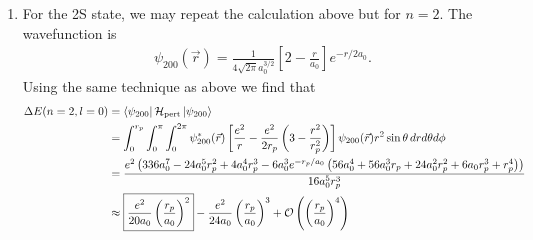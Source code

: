 \documentclass{article}
\theoremstyle{definition}
\newcommand{\ham}{\mathcal{H}}
\newcommand{\f}[2]{\frac{#1}{#2}}
\newcommand{\lp}{\left(}
\newcommand{\rp}{\right)}
\newcommand{\lb}{\left[}
\newcommand{\rb}{\right]}
\begin{document}
\begin{enumerate}[label=(\alph*)]
	
	Mathematica code:
	\begin{lstlisting}
	(*define psi_100*)
	In[4]:= psi100 = (1/Sqrt[Pi])*(1/a0)^(3/2)*Exp[-r/a0];
	
	(*Evaluate integral*)
	In[5]:= Integrate[
	psi100*psi100*(e^2/r - (e^2/(2*rp))*(3 - r^2/rp^2))*r^2*Sin[t], {r, 
	0, rp}, {t, 0, Pi}, {p, 0, 2 Pi}] // FullSimplify
	
	Out[5]= (e^2 (3 a0^3 - 3 a0 rp^2 + 2 rp^3 - 
	3 a0 E^(-((2 rp)/a0)) (a0 + rp)^2))/(2 a0 rp^3)
	
	(*get corrections term by term by expanding the exponential*)
	In[29]:= FullSimplify[Series[Exp[-x], {x, 0, 6}]] /. {x -> 2*rp/a0}
	
	Out[29]= SeriesData[2 a0^(-1) rp, 0, {1, -1, 
	Rational[1, 2], 
	Rational[-1, 6], 
	Rational[1, 24], 
	Rational[-1, 120], 
	Rational[1, 720]}, 0, 7, 1]
	
	In[32]:= 1/(2 a0 rp^3)
	e^2 (3 a0^3 - 3 a0 rp^2 + 2 rp^3 - 
	3 a0 (1 - (2 rp)/a0 + 1/2 ((2 rp)/a0)^2 - 1/6 ((2 rp)/a0)^3 + 
	1/24 ((2 rp)/a0)^4 - 1/120 ((2 rp)/a0)^5 + 
	1/720 ((2 rp)/a0)^6) (a0 + rp)^2) // Expand
	
	Out[32]= (2 e^2 rp^2)/(5 a0^3) - (e^2 rp^3)/(3 a0^4) + (2 e^2 rp^4)/(
	15 a0^5) - (2 e^2 rp^5)/(15 a0^6)
	\end{lstlisting}
	
	
	
	\item For the 2S state, we may repeat the calculation above but for $n=2$. The wavefunction is 
	\begin{align*}
	\psi_{200}(\vec{r}) = \f{1}{4\sqrt{2 \pi} a_0^{3/2}} \lb 2 - \f{r}{a_0} \rb e^{-r/2a_0}.
	\end{align*}
	Using the same technique as above we find that
	\begin{align*}
	\Delta E(n=2,l=0) 
	&= \bra{\psi_{200}} \ham_\text{pert} \ket{\psi_{200}} \\
	&= \int_0^{r_p} \int_0^{\pi}\int_0^{2\pi} \psi^*_{200}(\vec{r}) \lb \f{e^2}{r} - \f{e^2}{2r_p}\lp 3 - \f{r^2}{r_p^2} \rp  \rb \psi_{200}(\vec{r}) r^2 \sin\theta\,drd\theta d\phi \\
	&= \frac{e^2 \left(336 a_0^7-24 a_0^5 r_p^2+4 a_0^4 r_p^3-6
		a_0^3 e^{-r_p/a_0} \left(56 a_0^4+56 a_0^3
		r_p+24 a_0^2 r_p^2+6 a_0
		r_p^3+r_p^4\right)\right)}{16 a_0^5 r_p^3}\\
	&\approx \boxed{\f{e^2}{20a_0} \lp \f{r_p}{a_0} \rp^2} - \f{e^2}{24 a_0}\lp \f{r_p}{a_0} \rp^3 + \mathcal{O}\lp \lp \f{r_p}{a_0}\rp ^4\rp 
	\end{align*}
	

\end{enumerate}
\end{document}

